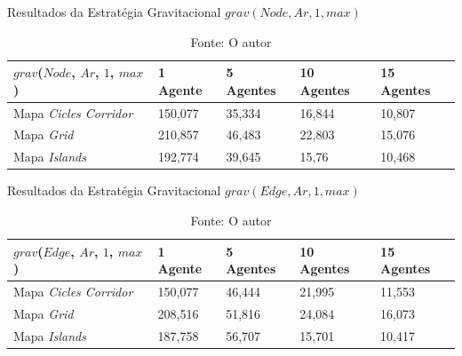 \begin{table}
	\centering
	\caption{Resultados da Estratégia Gravitacional $grav(Node,Ar,1,max)$}
	\label{result_grav2}
	\begin{tabularx}{\linewidth}{|X|X|X|X|X|}
		\hline
		\textbf{$grav$($Node$, $Ar$, $1$, $max$)} & \textbf{1 Agente} & \textbf{5 Agentes} & \textbf{10 Agentes} & \textbf{15 Agentes} \\
		\hline
		Mapa \textit{Cicles Corridor} & 150,077 & 35,334 & 16,844 & 10,807 \\
		\hline
		Mapa \textit{Grid} & 210,857 & 46,483 & 22,803 & 15,076 \\
		\hline
		Mapa \textit{Islands} & 192,774 & 39,645 & 15,76 & 10,468 \\
		\hline
	\end{tabularx}
	\caption*{Fonte: O autor}
\end{table}

\begin{table}
	\centering
	\caption{Resultados da Estratégia Gravitacional $grav(Edge,Ar,1,max)$}
	\label{result_grav3}
	\begin{tabularx}{\linewidth}{|X|X|X|X|X|}
		\hline
		\textbf{$grav$($Edge$, $Ar$, $1$, $max$)} & \textbf{1 Agente} & \textbf{5 Agentes} & \textbf{10 Agentes} & \textbf{15 Agentes} \\
		\hline
		Mapa \textit{Cicles Corridor} & 150,077 & 46,444 & 21,995 & 11,553 \\
		\hline
		Mapa \textit{Grid} & 208,516 & 51,816 & 24,084 & 16,073 \\
		\hline
		Mapa \textit{Islands} & 187,758 & 56,707 & 15,701 & 10,417 \\
		\hline
	\end{tabularx}
	\caption*{Fonte: O autor}
\end{table}

